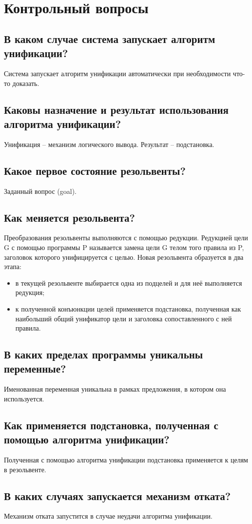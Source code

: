 \chapter{Контрольный вопросы}

\section{В каком случае система запускает алгоритм унификации?}

Система запускает алгоритм унификации автоматически при необходимости что-то доказать.

\section{Каковы назначение и результат использования алгоритма унификации?}

Унификация -- механизм логического вывода. Результат -- подстановка.

\section{Какое первое состояние резольвенты?}

Заданный вопрос (goal).

\section{Как меняется резольвента?}

Преобразования резольвенты выполняются с помощью редукции.
Редукцией цели G с помощью программы P называется замена цели G телом
того правила из P, заголовок которого унифицируется с целью.
Новая резольвента образуется в два этапа:
\begin{itemize}
    \item в текущей резольвенте выбирается одна из подцелей и для неё выполняется редукция;
    \item к полученной конъюнкции целей применяется подстановка, полученная как наибольший общий унификатор цели и заголовка сопоставленного с ней правила.
\end{itemize}

\section{В каких пределах программы уникальны переменные?}

Именованная переменная уникальна в рамках предложения, в котором она используется.

\section{Как применяется подстановка, полученная с помощью алгоритма унификации?}

Полученная с помощью алгоритма унификации подстановка применяется к целям в резольвенте.

\section{В каких случаях запускается механизм отката?}

Механизм отката запустится в случае неудачи алгоритма унификации.